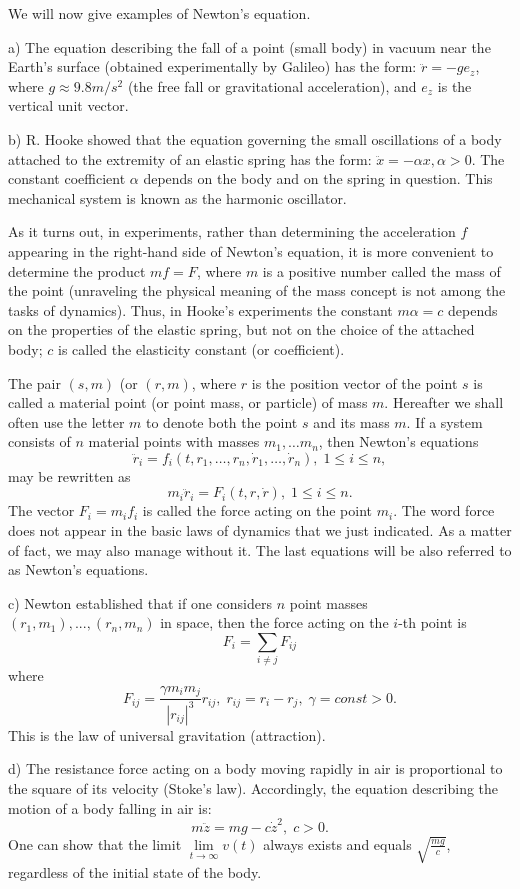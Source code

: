 \documentclass[a4paper]{article}
\begin{document}
We will now give examples of Newton's equation.

a) The equation describing the fall of a point (small body) in vacuum near the Earth's surface (obtained experimentally by
Galileo) has the form: $\ddot r = -ge_z$, where $g \approx 9.8 m/s^2$ (the free fall or gravitational acceleration), and $e_z$
is the vertical unit vector.

b) R. Hooke showed that the equation governing the small oscillations of a body attached to the extremity of an elastic spring
has the form: $\ddot x = -\alpha x, \alpha > 0$. The constant coefficient $\alpha$ depends on the body and on the spring in question. This
mechanical system is known as the harmonic oscillator.

As it turns out, in experiments, rather than determining the acceleration $f$ appearing in the right-hand side of Newton's
equation, it is more convenient to determine the product $mf=F$, where $m$ is a positive number called the mass of the point
(unraveling the physical meaning of the mass concept is not among the tasks of dynamics). Thus, in Hooke's experiments the
constant $m \alpha=c$ depends on the properties of the elastic spring, but not on the choice of the attached body; $c$ is called
the elasticity constant (or coefficient).

The pair $(s,m)$ (or $(r, m)$, where $r$ is the position vector of the point $s$ is called a material point (or point mass,
or particle) of mass $m$. Hereafter we shall often use the letter $m$ to denote both the point $s$ and its mass $m$. If a
system consists of $n$ material points with masses $m_1, \ldots m_n$, then Newton's equations
$$\ddot r_i = f_i(t,r_1, \ldots, r_n, \dot r_1, \ldots, \dot r_n), \; 1 \leqslant i \leqslant n,$$
may be rewritten as
$$m_i \ddot r_i = F_i(t,r,\dot r), \; 1 \leqslant i \leqslant n.$$
The vector $F_i = m_i f_i$ is called the force acting on the point $m_i$. The word force does not appear in the basic laws
of dynamics that we just indicated. As a matter of fact, we may also manage without it. The last equations will be also referred
to as Newton's equations.

c) Newton established that if one considers $n$ point masses $(r_1,m_1),...,(r_n,m_n)$ in space, then the force acting on
the $i$-th point is
$$F_i = \sum_{i \neq j} F_{ij}$$
where
$$F_{ij}=\frac{\gamma m_i m_j}{|r_{ij}|^3} r_{ij}, \; r_{ij}=r_i-r_j, \; \gamma = const > 0.$$
This is the law of universal gravitation (attraction).

d) The resistance force acting on a body moving rapidly in air is proportional to the square of its velocity (Stoke's law).
Accordingly, the equation describing the motion of a body falling in air is: $$m \ddot z = mg - c \dot z^2, \; c > 0.$$
One can show that the limit $\lim\limits_{t \rightarrow \infty} v(t)$ always exists and equals $\sqrt{\frac{mg}{c}}$, regardless
of the initial state of the body.
\end{document}
